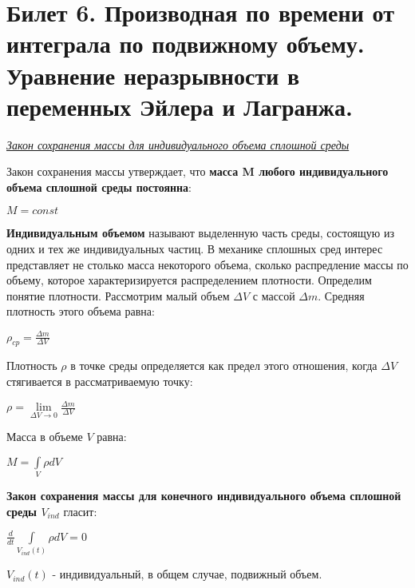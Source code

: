 \newpage
\section{Билет 6. Производная по времени от интеграла по подвижному объему. Уравнение неразрывности в переменных Эйлера и Лагранжа.}
\begin{center}
  \textit{\underline{Закон сохранения массы для индивидуального объема сплошной среды}}
\end{center}

Закон сохранения массы утверждает, что \textbf{масса M любого индивидуального объема сплошной среды постоянна}:
\begin{center}$
    M = const
  $\end{center}
\textbf{Индивидуальным объемом} называют выделенную часть среды, состоящую из одних и тех же индивидуальных частиц. В механике сплошных сред интерес представляет не столько масса некоторого объема, сколько распредление массы по объему, которое характеризируется распределением плотности. Определим понятие плотности. Рассмотрим малый объем $\Delta {V}$ с массой $\Delta m$. Средняя плотность этого объема равна:
\begin{center}$
    \rho_{cp} = \frac{\Delta m}{\Delta V}
  $\end{center}

Плотность $\rho$ в точке среды определяется как предел этого отношения, когда $\Delta V$ стягивается в рассматриваемую точку:
\begin{center}$
    \rho = \lim\limits_{\Delta V \to 0} \frac{\Delta m}{\Delta V}
  $\end{center}

Масса в объеме $V$ равна:
\begin{center}$
    M = \int\limits_V \rho dV
  $\end{center}

\textbf{Закон сохранения массы для конечного индивидуального объема сплошной среды $V_{ind}$} гласит:
\begin{center}$
    \frac{d}{dt} \int\limits_{V_{ind}(t)} \rho dV = 0
  $\end{center}

$V_{ind}(t)$ - индивидуальный, в общем случае, подвижный объем.

